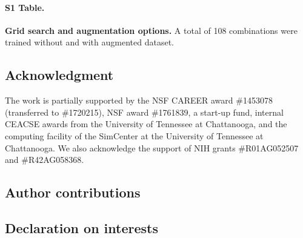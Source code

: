 \documentclass[conference]{IEEEtran}
\begin{document}
\paragraph*{S1 Table.}


\label{S1_Table}
{\bf Grid search and augmentation options.} A total of 108 combinations were trained without and with augmented dataset. 


\subsection*{Acknowledgment}

The work is partially supported by the NSF CAREER award \#1453078 (transferred to \#1720215), NSF award \#1761839, a  start-up fund, internal CEACSE awards from the University of Tennessee at Chattanooga, and the computing facility of the SimCenter at the University of Tennessee at Chattanooga. We also acknowledge the support of NIH grants \#R01AG052507 and \#R42AG058368.


\subsection*{Author contributions}


\subsection*{Declaration on interests}
\end{document}
